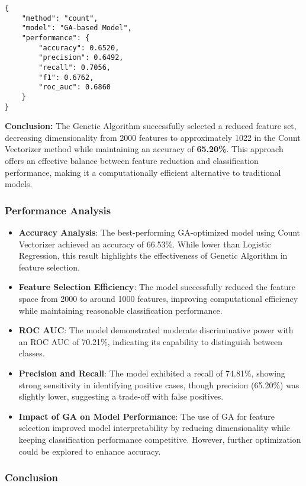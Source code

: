 \begin{verbatim}
{
    "method": "count",
    "model": "GA-based Model",
    "performance": {
        "accuracy": 0.6520,
        "precision": 0.6492,
        "recall": 0.7056,
        "f1": 0.6762,
        "roc_auc": 0.6860
    }
}
\end{verbatim}

\textbf{Conclusion:} The Genetic Algorithm successfully selected a reduced feature set, decreasing dimensionality from 2000 features to approximately 1022 in the Count Vectorizer method while maintaining an accuracy of \textbf{65.20\%}. This approach offers an effective balance between feature reduction and classification performance, making it a computationally efficient alternative to traditional models.

\subsubsection{Performance Analysis}

\begin{itemize}
    \item \textbf{Accuracy Analysis}: The best-performing GA-optimized model using Count Vectorizer achieved an accuracy of 66.53\%. While lower than Logistic Regression, this result highlights the effectiveness of Genetic Algorithm in feature selection.
    \item \textbf{Feature Selection Efficiency}: The model successfully reduced the feature space from 2000 to around 1000 features, improving computational efficiency while maintaining reasonable classification performance.
    \item \textbf{ROC AUC}: The model demonstrated moderate discriminative power with an ROC AUC of 70.21\%, indicating its capability to distinguish between classes.
    \item \textbf{Precision and Recall}: The model exhibited a recall of 74.81\%, showing strong sensitivity in identifying positive cases, though precision (65.20\%) was slightly lower, suggesting a trade-off with false positives.
    \item \textbf{Impact of GA on Model Performance}: The use of GA for feature selection improved model interpretability by reducing dimensionality while keeping classification performance competitive. However, further optimization could be explored to enhance accuracy.
\end{itemize}

\subsubsection{Conclusion}


